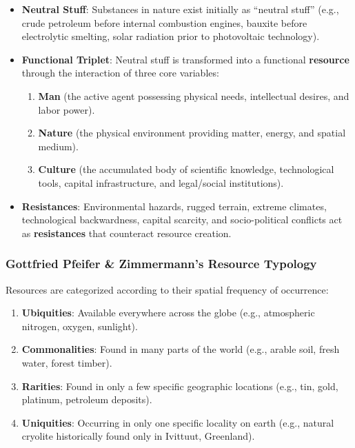 \documentclass[11pt,a4paper]{article}
\begin{document}
\begin{itemize}[leftmargin=*]
  \item \textbf{Neutral Stuff}: Substances in nature exist initially as ``neutral stuff'' (e.g., crude petroleum before internal combustion engines, bauxite before electrolytic smelting, solar radiation prior to photovoltaic technology).
  \item \textbf{Functional Triplet}: Neutral stuff is transformed into a functional \textbf{resource} through the interaction of three core variables:
  \begin{enumerate}
    \item \textbf{Man} (the active agent possessing physical needs, intellectual desires, and labor power).
    \item \textbf{Nature} (the physical environment providing matter, energy, and spatial medium).
    \item \textbf{Culture} (the accumulated body of scientific knowledge, technological tools, capital infrastructure, and legal/social institutions).
  \end{enumerate}
  \item \textbf{Resistances}: Environmental hazards, rugged terrain, extreme climates, technological backwardness, capital scarcity, and socio-political conflicts act as \textbf{resistances} that counteract resource creation.
\end{itemize}

\subsubsection{Gottfried Pfeifer \& Zimmermann's Resource Typology}
Resources are categorized according to their spatial frequency of occurrence:
\begin{enumerate}[leftmargin=*]
  \item \textbf{Ubiquities}: Available everywhere across the globe (e.g., atmospheric nitrogen, oxygen, sunlight).
  \item \textbf{Commonalities}: Found in many parts of the world (e.g., arable soil, fresh water, forest timber).
  \item \textbf{Rarities}: Found in only a few specific geographic locations (e.g., tin, gold, platinum, petroleum deposits).
  \item \textbf{Uniquities}: Occurring in only one specific locality on earth (e.g., natural cryolite historically found only in Ivittuut, Greenland).
\end{enumerate}
\end{document}
